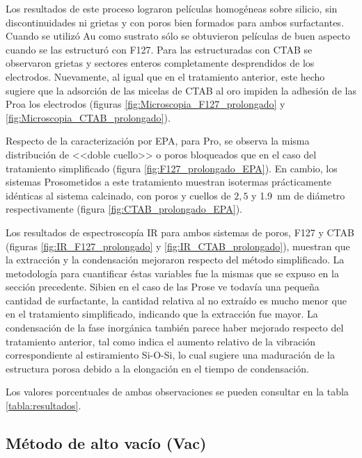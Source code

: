 	 	 Los resultados de este proceso lograron películas homogéneas sobre silicio, sin discontinuidades ni grietas y con poros bien formados para ambos surfactantes. Cuando se utilizó Au como sustrato sólo se obtuvieron películas de buen aspecto cuando se las estructuró con F127. Para las estructuradas con CTAB se observaron grietas y sectores enteros completamente desprendidos de los electrodos. Nuevamente, al igual que en el tratamiento anterior, este hecho sugiere que la adsorción de las micelas de CTAB al oro impiden la adhesión de las Pro\pdmC\space a los electrodos (figuras \ref{fig:Microscopia_F127_prolongado} y \ref{fig:Microscopia_CTAB_prolongado}).

	 	 Respecto de la caracterización por EPA, para Pro\pdmF, se observa la misma distribución de <<doble cuello>> o poros bloqueados que en el caso del tratamiento simplificado (figura \ref{fig:F127_prolongado_EPA}). En cambio, los sistemas Pro\pdmC\space sometidos a este tratamiento muestran isotermas prácticamente idénticas al sistema calcinado, con poros y cuellos de $2,5$ y \SI{1,9}{\nm} de diámetro respectivamente (figura \ref{fig:CTAB_prolongado_EPA}).

	 	 Los resultados de espectroscopía IR para ambos sistemas de poros, F127 y CTAB (figuras \ref{fig:IR_F127_prolongado} y \ref{fig:IR_CTAB_prolongado}), muestran que la extracción y la condensación mejoraron respecto del método simplificado. La metodología para cuantificar éstas variables fue la mismas que se expuso en la sección precedente. Si\space bien en el caso de las Pro\pdmC\space se ve todavía una pequeña cantidad de surfactante, la cantidad relativa al no extraído es mucho menor que en el tratamiento simplificado, indicando que la extracción fue mayor. La condensación de la fase inorgánica también parece haber mejorado respecto del tratamiento anterior, tal como indica el aumento relativo de la vibración correspondiente al estiramiento Si-O-Si, lo cual sugiere una maduración de la estructura porosa debido a la elongación en el tiempo de condensación. 

	 	 Los valores porcentuales de ambas observaciones se pueden consultar en la tabla \ref{tabla:resultados}.

	 \subsection{Método de alto vacío (Vac)}\label{sec:trat-vacio}

